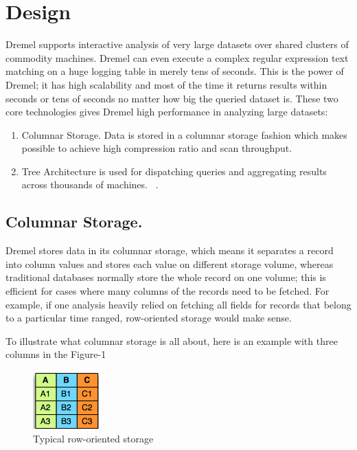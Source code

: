 \documentclass[9pt,twocolumn,twoside]{../../styles/osajnl}
\begin{document}
\section{Design}

Dremel supports interactive analysis of very large datasets over shared clusters of commodity machines.  Dremel can even execute a complex regular expression text matching on a huge logging table in merely tens of seconds. This is the power of Dremel; it has high scalability and most of the time it returns results within seconds or tens of seconds no matter how big the queried dataset is. These two core technologies gives Dremel high performance in analyzing large datasets: 

\begin{enumerate}
  \item 	Columnar Storage. Data is stored in a columnar storage fashion which makes possible to achieve  high compression ratio and scan throughput.
  \item Tree Architecture is used for dispatching queries and aggregating results across thousands of machines. ~\cite{paper-dremel}.
\end{enumerate}

\subsection{Columnar Storage.}
Dremel stores data in its columnar storage, which means it separates a record into column values and stores each value on different storage volume, whereas traditional databases normally store the whole record on one volume; this is efficient for cases where many columns of the records need to be fetched. For example, if one analysis heavily relied on fetching all fields for records that belong to a particular time ranged, row-oriented storage would make sense. 

To illustrate what columnar storage is all about, here is an example with three columns in the Figure-1


\begin{figure}[H]
 \centering
\includegraphics[scale=0.7]{images/image1}
\caption{Typical row-oriented storage}
\end{figure}
\end{document}
